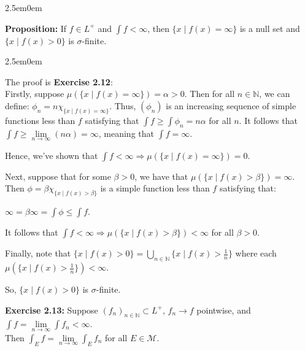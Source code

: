 \documentclass{book}
\newcommand{\hTwo}{%
\color{MidnightBlue}%
   \fontsize{13}{15}\selectfont%
}
\newcommand{\exOne}{%
   \color{Purple}%
   \fontsize{13}{15}\selectfont%
}
\newcommand{\exTwo}{%
   \color{Purple}%
   \fontsize{13}{15}\selectfont%
}
\newcommand{\exTwoP}{%
   \color{RedViolet}%
   \fontsize{13}{15}\selectfont%
}
\newenvironment{myIndent}{%
   \begin{adjustwidth}{2.5em}{0em}%
}{%
   \end{adjustwidth}%
}
\newcommand{\blab}[1]{\textbf{#1}}
\newcommand{\retTwo}{\hfill\bigbreak}
\begin{document}
\begin{myIndent}\hTwo 
   \blab{Proposition:} If $f \in L^+$ and $\int f < \infty$, then $\{x \mid f(x) = \infty\}$ is a null set and\\ $\{x \mid f(x) > 0\}$ is $\sigma$-finite.
   \begin{myIndent}\exTwo
      The proof is \blab{Exercise 2.12}:\exTwoP\\
      Firstly, suppose $\mu(\{x \mid f(x) = \infty\}) = \alpha > 0$. Then for all $n \in \mathbb{N}$, we can\\ define: $\phi_n = n\chi_{\{x \mid f(x) = \infty\}}$. Thus, $(\phi_n)$ is an increasing sequence of simple functions less than $f$ satisfying that $\int f \geq \int \phi_n = n\alpha$ for all $n$. It follows that $\int f \geq \lim\limits_{n \rightarrow \infty} (n\alpha) = \infty$, meaning that $\int f = \infty$.\retTwo
      
      Hence, we've shown that $\int f < \infty \Longrightarrow \mu(\{x \mid f(x) = \infty\}) = 0$.\retTwo

      Next, suppose that for some $\beta > 0$, we have that $\mu(\{x \mid f(x) > \beta\}) = \infty$. Then $\phi = \beta \chi_{\{x \mid f(x) > \beta\}}$ is a simple function less than $f$ satisfying that:
       
      {\centering $\infty = \beta\infty = \int \phi \leq \int f$.\retTwo\par}

      It follows that $\int f < \infty \Longrightarrow \mu(\{x \mid f(x) > \beta\}) < \infty$ for all $\beta > 0$.\retTwo

      Finally, note that $\{x \mid f(x) > 0\} = \bigcup\limits_{n \in \mathbb{N}}\{x \mid f(x) > \frac{1}{n}\}$ where each\\ [-8pt] $\mu(\{x \mid f(x) > \frac{1}{n}\}) < \infty$.\retTwo

      So, $\{x \mid f(x) > 0\}$ is $\sigma$-finite.\retTwo
   \end{myIndent}
\end{myIndent}


\retTwo


\exOne
\blab{Exercise 2.13:} Suppose $(f_n)_{n \in \mathbb{N}} \subset L^+$, $f_n \rightarrow f$ pointwise, and $\int f = \lim\limits_{n \rightarrow \infty} \int f_n < \infty$.\\ [-3pt] Then $\int_E f = \lim\limits_{n \rightarrow \infty} \int_E f_n$ for all $E \in \mathcal{M}$.\\ [-8pt]
\end{document}
